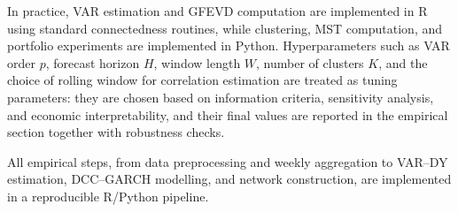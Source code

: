 In practice, VAR estimation and GFEVD computation are implemented in \textsf{R} using
standard connectedness routines, while clustering, MST computation, and portfolio
experiments are implemented in \textsf{Python}. Hyperparameters such as VAR order $p$,
forecast horizon $H$, window length $W$, number of clusters $K$, and the choice of
rolling window for correlation estimation are treated as tuning parameters: they are
chosen based on information criteria, sensitivity analysis, and economic
interpretability, and their final values are reported in the empirical section together
with robustness checks.

All empirical steps, from data preprocessing and weekly aggregation to VAR--DY
estimation, DCC--GARCH modelling, and network construction, are implemented in a
reproducible \textsf{R}/\textsf{Python} pipeline.
